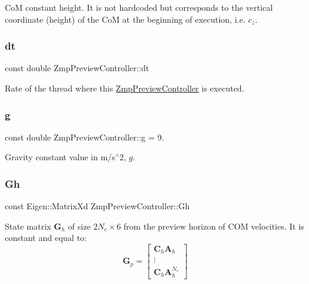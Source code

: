 CoM constant height. It is not hardcoded but corresponds to the vertical coordinate (height) of the CoM at the beginning of execution, i.\+e. $ c_z $. \hypertarget{classZmpPreviewController_abf1a3ec8d1698afab1c20bba32b5a724}{}\label{classZmpPreviewController_abf1a3ec8d1698afab1c20bba32b5a724} 
\subsubsection{\texorpdfstring{dt}{dt}}
{\footnotesize\ttfamily const double Zmp\+Preview\+Controller\+::dt\hspace{0.3cm}{\ttfamily [private]}}

Rate of the thread where this \hyperlink{classZmpPreviewController}{Zmp\+Preview\+Controller} is executed. \hypertarget{classZmpPreviewController_a344571f012aa58250d7625905681bf1b}{}\label{classZmpPreviewController_a344571f012aa58250d7625905681bf1b} 
\subsubsection{\texorpdfstring{g}{g}}
{\footnotesize\ttfamily const double Zmp\+Preview\+Controller\+::g = 9.\hspace{0.3cm}{\ttfamily [private]}}

Gravity constant value in m/s$^\wedge$2, $ g $. \hypertarget{classZmpPreviewController_a9429cb06fdd2c3ca5036a2fd48303632}{}\label{classZmpPreviewController_a9429cb06fdd2c3ca5036a2fd48303632} 
\subsubsection{\texorpdfstring{Gh}{Gh}}
{\footnotesize\ttfamily const Eigen\+::\+Matrix\+Xd Zmp\+Preview\+Controller\+::\+Gh\hspace{0.3cm}{\ttfamily [private]}}

State matrix $\mathbf{G}_h$ of size $2N_c \times 6$ from the preview horizon of C\+OM velocities. It is constant and equal to\+: \[ \mathbf{G}_p = \left[\begin{array}{c} \mathbf{C}_h\mathbf{A}_h \\ \vdots \\ \mathbf{C}_h\mathbf{A}^{N_c}_h \end{array}\right] \] \hypertarget{classZmpPreviewController_a53a7d8af5be4a5d5cea99fad2ea48979}{}\label{classZmpPreviewController_a53a7d8af5be4a5d5cea99fad2ea48979} 
